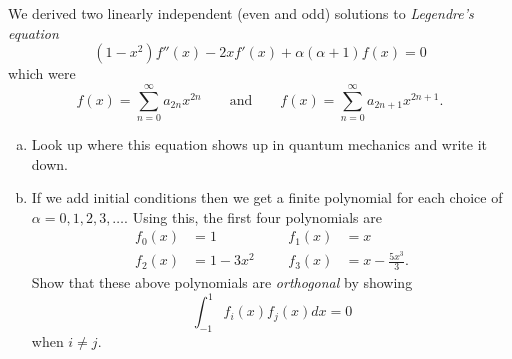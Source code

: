 \documentclass[12pt]{article} %
\begin{document}
\begin{problem}
We derived two linearly independent (even and odd) solutions to \emph{Legendre's equation}
\[
(1-x^2)f''(x)-2xf'(x)+\alpha(\alpha+1)f(x)=0
\]
which were
\[
f(x)=\sum_{n=0}^\infty a_{2n}x^{2n} \qquad \textrm{and} \qquad f(x)=\sum_{n=0}^\infty a_{2n+1}x^{2n+1}.
\]
\begin{enumerate}[(a)]
    \item Look up where this equation shows up in quantum mechanics and write it down.
    \item If we add initial conditions then we get a finite polynomial for each choice of $\alpha = 0,1,2,3,\dots$. Using this, the first four polynomials are
    \begin{align*}
        f_0(x)&=1 &&& f_1(x)&=x\\
        f_2(x)&=1-3x^2 &&& f_3(x)&=x-\frac{5x^3}{3}.
    \end{align*}
    Show that these above polynomials are \emph{orthogonal} by showing
    \[
    \int_{-1}^1 f_i(x)f_j(x)dx = 0 
    \]
    when $i\neq j$.
\end{enumerate}
\end{problem}
\end{document}
